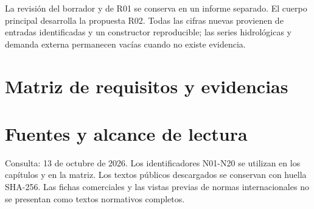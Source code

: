 \documentclass[11pt,letterpaper]{report}
\begin{document}
La revisión del borrador y de R01 se conserva en un informe separado. El cuerpo principal desarrolla la propuesta R02. Todas las cifras nuevas provienen de entradas identificadas y un constructor reproducible; las series hidrológicas y demanda externa permanecen vacías cuando no existe evidencia.
\begingroup\small\setlength{\parskip}{0pt}
\tableofcontents
\endgroup
\clearpage{}








\appendix
\chapter{Matriz de requisitos y evidencias}
\begingroup\footnotesize\renewcommand{\arraystretch}{1.08}

\endgroup
\chapter{Fuentes y alcance de lectura}
Consulta: 13 de octubre de 2026. Los identificadores N01-N20 se utilizan en los capítulos y en la matriz. Los textos públicos descargados se conservan con huella SHA-256. Las fichas comerciales y las vistas previas de normas internacionales no se presentan como textos normativos completos.
\small\normalsize
\end{document}
